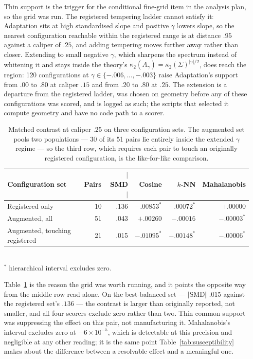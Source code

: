 \documentclass[11pt,a4paper]{article}
\begin{document}
Thin support is the trigger for the conditional fine-grid item in the analysis
plan, so the grid was run. The registered tempering ladder cannot satisfy it:
Adaptation sits at high standardised slope and positive $\gamma$ lowers slope,
so the nearest configuration reachable within the registered range is at
distance $.95$ against a caliper of $.25$, and adding tempering moves further
away rather than closer. Extending to small negative $\gamma$, which sharpens
the spectrum instead of whitening it and stays inside the theory's
$\kappa_2(A_\gamma)=\kappa_2(\Sigma)^{|\gamma|/2}$, does reach the region: 120
configurations at $\gamma\in\{-.006,\dots,-.003\}$ raise Adaptation's support
from $.00$ to $.80$ at caliper $.15$ and from $.20$ to $.80$ at $.25$. The
extension is a departure from the registered ladder, was chosen on geometry
before any of these configurations was scored, and is logged as such; the
scripts that selected it compute geometry and have no code path to a scorer.

\begin{table}[t]
\centering
\caption{Matched contrast at caliper $.25$ on three configuration sets. The augmented set pools two populations --- 30 of its 51 pairs lie entirely inside the extended $\gamma$ regime --- so the third row, which requires each pair to touch an originally registered configuration, is the like-for-like comparison.}
\label{tab:support}
\small
\begin{tabular}{lrrrrr}
\toprule
Configuration set & Pairs & $|$SMD$|$ & Cosine & $k$-NN & Mahalanobis\\
\midrule
Registered only & 10 & .136 & $-.00853^\ast$ & $-.00072^\ast$ & $+.00000$\\
Augmented, all & 51 & .043 & $+.00260$ & $-.00016$ & $-.00003^\ast$\\
Augmented, touching registered & 21 & .015 & $-.01095^\ast$ & $-.00148^\ast$ & $-.00006^\ast$\\
\bottomrule
\end{tabular}
\\[2pt]
\footnotesize $^\ast$ hierarchical interval excludes zero.
\end{table}

Table~\ref{tab:support} is the reason the grid was worth running, and it points
the opposite way from the middle row read alone. On the best-balanced set ---
$|$SMD$|$ $.015$ against the registered set's $.136$ --- the contrast is larger
than originally reported, not smaller, and all four scorers exclude zero rather
than two. Thin common support was suppressing the effect on this pair, not
manufacturing it. Mahalanobis's interval excludes zero at $-6\times10^{-5}$,
which is detectable at this precision and negligible at any other reading; it is
the same point Table~\ref{tab:susceptibility} makes about the difference between
a resolvable effect and a meaningful one.
\end{document}

